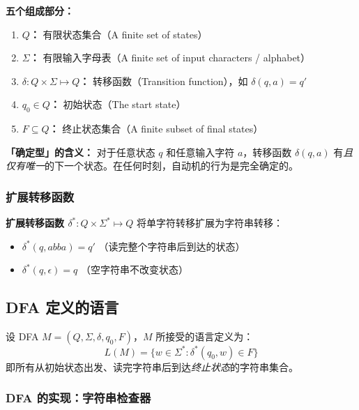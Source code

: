 \documentclass[12pt,a4paper]{ctexart}
\newcommand{\term}[1]{\textbf{\textcolor{mainblue}{#1}}}
\newcommand{\enterm}[1]{\textbf{\textcolor{subblue}{#1}}}
\begin{document}
\textbf{五个组成部分：}
\begin{enumerate}[itemsep=0.3em]
  \item \enterm{$Q$：} 有限状态集合（A finite set of states）
  \item \enterm{$\Sigma$：} 有限输入字母表（A finite set of input characters / alphabet）
  \item \enterm{$\delta: Q \times \Sigma \mapsto Q$：} 转移函数（Transition function），如 $\delta(q, a) = q'$
  \item \enterm{$q_0 \in Q$：} 初始状态（The start state）
  \item \enterm{$F \subseteq Q$：} 终止状态集合（A finite subset of final states）
\end{enumerate}

\begin{notebox}
  \textbf{「确定型」的含义：} 对于任意状态 $q$ 和任意输入字符 $a$，转移函数 $\delta(q, a)$ 有\emph{且仅有唯一}的下一个状态。在任何时刻，自动机的行为是完全确定的。
\end{notebox}

\subsubsection{扩展转移函数}

\begin{keybox}
  \term{扩展转移函数 $\delta^*: Q \times \Sigma^* \mapsto Q$} 将单字符转移扩展为字符串转移：
  \begin{itemize}
    \item $\delta^*(q, abba) = q'$ （读完整个字符串后到达的状态）
    \item $\delta^*(q, \epsilon) = q$ （空字符串不改变状态）
  \end{itemize}
\end{keybox}

\subsection{DFA 定义的语言}

\begin{keybox}
  设 DFA $M = (Q, \Sigma, \delta, q_0, F)$，$M$ 所接受的语言定义为：
  $$L(M) = \{ w \in \Sigma^* : \delta^*(q_0, w) \in F \}$$
  即所有从初始状态出发、读完字符串后到达\emph{终止状态}的字符串集合。
\end{keybox}

\subsubsection{DFA 的实现：字符串检查器}
\end{document}

